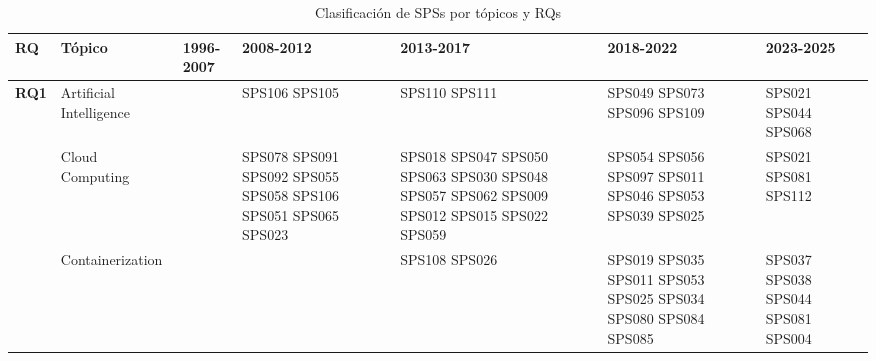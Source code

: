 \begin{table*}[htbp]
	\centering
	\caption{Clasificación de SPSs por tópicos y RQs}
	\label{table:sps_classification_by_topic_rq}
	\renewcommand{\arraystretch}{1.2}
	\setlength{\tabcolsep}{6pt}
	\begin{tabularx}{\textwidth}{p{0.8cm}p{2.5cm}>{\raggedright\arraybackslash}X>{\raggedright\arraybackslash}X>{\raggedright\arraybackslash}X>{\raggedright\arraybackslash}X>{\raggedright\arraybackslash}X}
		\toprule
		\textbf{RQ}                           & \textbf{Tópico}         & \textbf{1996-2007}                                      & \textbf{2008-2012}                                                                                                            & \textbf{2013-2017}                                                                         & \textbf{2018-2022}                                                                  & \textbf{2023-2025}                 \\
		\midrule
		\multirow{12}{*}[-11em]{\textbf{RQ1}} & Artificial Intelligence &                                                         & SPS106 SPS105                                                                                                                 & SPS110 SPS111                                                                              & SPS049 SPS073 SPS096 SPS109                                                         & SPS021 SPS044 SPS068               \\
		\addlinespace[0.3em]
		                                      & Cloud Computing         &                                                         & SPS078 SPS091 SPS092 SPS055 SPS058 SPS106 SPS051 SPS065 SPS023                                                                & SPS018 SPS047 SPS050 SPS063 SPS030 SPS048 SPS057 SPS062 SPS009 SPS012 SPS015 SPS022 SPS059 & SPS054 SPS056 SPS097 SPS011 SPS046 SPS053 SPS039 SPS025                             & SPS021 SPS081 SPS112               \\
		\addlinespace[0.3em]
		                                      & Containerization        &                                                         &                                                                                                                               & SPS108 SPS026                                                                              & SPS019 SPS035 SPS011 SPS053 SPS025 SPS034 SPS080 SPS084 SPS085                      & SPS037 SPS038 SPS044 SPS081 SPS004 \\

\end{tabularx}
\end{table*}
